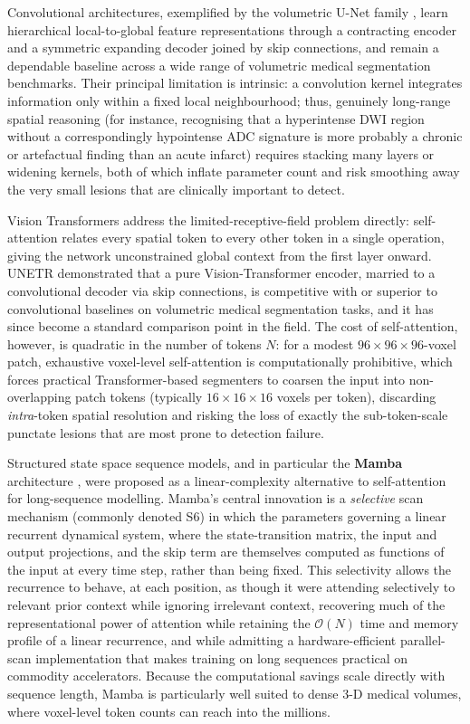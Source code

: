 \documentclass[pdflatex,sn-mathphys-num]{sn-jnl}
\begin{document}
Convolutional architectures, exemplified by the volumetric U-Net
family \citep{cciccek20163d,isensee2021nnu}, learn hierarchical
local-to-global feature representations through a contracting encoder
and a symmetric expanding decoder joined by skip connections, and
remain a dependable baseline across a wide range of volumetric medical
segmentation benchmarks. Their principal limitation is intrinsic:
a convolution kernel integrates information only within a fixed local
neighbourhood; thus, genuinely long-range spatial reasoning (for
instance, recognising that a hyperintense DWI region without a
correspondingly hypointense ADC signature is more probably a chronic
or artefactual finding than an acute infarct) requires stacking many
layers or widening kernels, both of which inflate parameter count and
risk smoothing away the very small lesions that are clinically
important to detect.

Vision Transformers \citep{dosovitskiy2020image} address the
limited-receptive-field problem directly: self-attention relates every
spatial token to every other token in a single operation, giving the
network unconstrained global context from the first layer onward.
UNETR \citep{hatamizadeh2022unetr} demonstrated that a pure
Vision-Transformer encoder, married to a convolutional decoder via
skip connections, is competitive with or superior to convolutional
baselines on volumetric medical segmentation tasks, and it has since
become a standard comparison point in the field. The cost of
self-attention, however, is quadratic in the number of tokens
$N$: for a modest $96 \times 96 \times 96$-voxel patch, exhaustive voxel-level
self-attention is computationally prohibitive, which forces practical
Transformer-based segmenters to coarsen the input into non-overlapping
patch tokens (typically $16 \times 16 \times 16$ voxels per token), discarding
\emph{intra}-token spatial resolution and risking the loss of
exactly the sub-token-scale punctate lesions that are most prone to
detection failure.

Structured state space sequence models, and in particular the
\textbf{Mamba} architecture \citep{gu2023mamba}, were proposed as a
linear-complexity alternative to self-attention for long-sequence
modelling. Mamba's central innovation is a \textit{selective} scan
mechanism (commonly denoted S6) in which the parameters governing a
linear recurrent dynamical system, where the state-transition matrix, the
input and output projections, and the skip term are themselves
computed as functions of the input at every time step, rather than
being fixed. This selectivity allows the recurrence to behave, at each
position, as though it were attending selectively to relevant prior
context while ignoring irrelevant context, recovering much of the
representational power of attention while retaining the
$\mathcal{O}(N)$ time and memory profile of a linear recurrence, and
while admitting a hardware-efficient parallel-scan implementation that
makes training on long sequences practical on commodity accelerators.
Because the computational savings scale directly with sequence length,
Mamba is particularly well suited to dense 3-D medical volumes, where
voxel-level token counts can reach into the millions.
\end{document}
